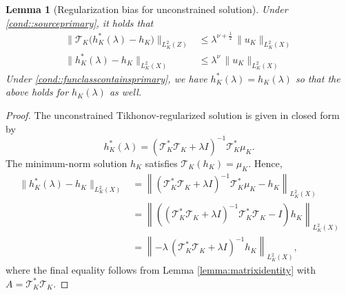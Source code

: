 \documentclass[11pt]{article}
\theoremstyle{plain}
\newtheorem{lemma}{Lemma}
\theoremstyle{definition}
\theoremstyle{remark}
\theoremstyle{definition}
\begin{document}
\begin{lemma}[Regularization bias for unconstrained solution]
\label{lemma::regbiasunconstrained}
Under  \ref{cond::sourceprimary}, it holds that
    \begin{align*}
    \bigl\|\mathcal{T}_K\bigl(h_K^*(\lambda)-h_K\bigr)\bigr\|_{L^2_K(Z)} &\leq   \lambda^{\nu+\frac12}\,\|u_K\|_{L^2_K(X)}\\
    \| h_K^*(\lambda) - h_K \|_{L^2_K(X)} &\leq    \lambda^\nu\,\|u_K\|_{L^2_K(X)}
\end{align*}
Under  \ref{cond::funclasscontainsprimary}, we have $h_K^*(\lambda) = h_K(\lambda)$ so that the above holds for $h_K(\lambda)$ as well.
\end{lemma}
\begin{proof}
    The unconstrained Tikhonov-regularized solution is given in closed form by
    \[
    h_K^*(\lambda) = \left( \mathcal{T}_K^* \mathcal{T}_K + \lambda I \right)^{-1} \mathcal{T}_K^* \mu_K.
    \]
    The minimum-norm solution \( h_K \) satisfies \( \mathcal{T}_K(h_K) = \mu_K \).  Hence,
 \begin{align*}
\| h_K^*(\lambda) - h_K \|_{L^2_K(X)}
&= \left\|   \left( \mathcal{T}_K^* \mathcal{T}_K + \lambda I \right)^{-1} \mathcal{T}_K^*\mu_K  -h_K \right\|_{L^2_K(X)} \\
&= \left\| \left( \left( \mathcal{T}_K^* \mathcal{T}_K + \lambda I \right)^{-1} \mathcal{T}_K^*\mathcal{T}_K  - I  \right) h_K \right\|_{L^2_K(X)}\\
&= \left\| -\lambda\, \left( \mathcal{T}_K^* \mathcal{T}_K + \lambda I \right)^{-1} h_K\right\|_{L^2_K(X)} ,
\end{align*}
where the final equality follows from Lemma \ref{lemma:matrixidentity} with $A = \mathcal{T}_K^* \mathcal{T}_K $.


\end{proof}
\end{document}
